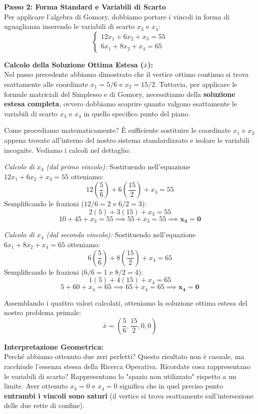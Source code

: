 \documentclass[12pt, a4paper]{article}
\begin{document}
	\vspace{0.4cm}
	\textbf{Passo 2: Forma Standard e Variabili di Scarto}\\
	Per applicare l'algebra di Gomory, dobbiamo portare i vincoli in forma di uguaglianza inserendo le variabili di scarto $x_3$ e $x_4$:
	\[
	\begin{cases}
		12x_1 + 6x_2 + x_3 = 55 \\
		6x_1 + 8x_2 + x_4 = 65
	\end{cases}
	\]
	
	\textbf{Calcolo della Soluzione Ottima Estesa ($\bar{x}$):}\\
	Nel passo precedente abbiamo dimostrato che il vertice ottimo continuo si trova esattamente alle coordinate $x_1 = 5/6$ e $x_2 = 15/2$. 
	Tuttavia, per applicare le formule matriciali del Simplesso e di Gomory, necessitiamo della \textbf{soluzione estesa completa}, ovvero dobbiamo scoprire quanto valgono esattamente le variabili di scarto $x_3$ e $x_4$ in quello specifico punto del piano.
	
	Come procediamo matematicamente? È sufficiente sostituire le coordinate $x_1$ e $x_2$ appena trovate all'interno del nostro sistema standardizzato e isolare le variabili incognite. Vediamo i calcoli nel dettaglio:
	
	\textit{Calcolo di $x_3$ (dal primo vincolo):}
	Sostituendo nell'equazione $12x_1 + 6x_2 + x_3 = 55$ otteniamo:
	\[
	12\left(\frac{5}{6}\right) + 6\left(\frac{15}{2}\right) + x_3 = 55
	\]
	Semplificando le frazioni ($12/6 = 2$ e $6/2 = 3$):
	\[
	2(5) + 3(15) + x_3 = 55
	\]
	\[
	10 + 45 + x_3 = 55 \implies 55 + x_3 = 55 \implies \mathbf{x_3 = 0}
	\]
	
	\textit{Calcolo di $x_4$ (dal secondo vincolo):}
	Sostituendo nell'equazione $6x_1 + 8x_2 + x_4 = 65$ otteniamo:
	\[
	6\left(\frac{5}{6}\right) + 8\left(\frac{15}{2}\right) + x_4 = 65
	\]
	Semplificando le frazioni ($6/6 = 1$ e $8/2 = 4$):
	\[
	1(5) + 4(15) + x_4 = 65
	\]
	\[
	5 + 60 + x_4 = 65 \implies 65 + x_4 = 65 \implies \mathbf{x_4 = 0}
	\]
	
	Assemblando i quattro valori calcolati, otteniamo la soluzione ottima estesa del nostro problema primale:
	\[
	\bar{x} = \left( \frac{5}{6}, \frac{15}{2}, 0, 0 \right)
	\]
	
	\textbf{Interpretazione Geometrica:}\\
	Perché abbiamo ottenuto due zeri perfetti? Questo risultato non è casuale, ma racchiude l'essenza stessa della Ricerca Operativa. Ricordate cosa rappresentano le variabili di scarto? Rappresentano lo "spazio non utilizzato" rispetto a un limite. 
	Aver ottenuto $x_3 = 0$ e $x_4 = 0$ significa che in quel preciso punto \textbf{entrambi i vincoli sono saturi} (il vertice si trova esattamente sull'intersezione delle due rette di confine). 
	
\end{document}
